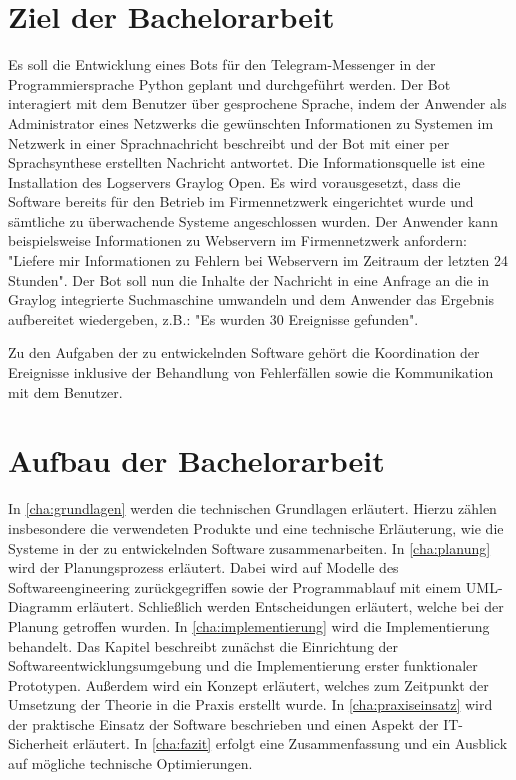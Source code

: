 \section{Ziel der Bachelorarbeit}

Es soll die Entwicklung eines Bots für den Telegram-Messenger in der Programmiersprache Python geplant und durchgeführt werden. Der Bot interagiert mit dem Benutzer über gesprochene Sprache, indem der Anwender als Administrator eines Netzwerks die gewünschten Informationen zu Systemen im Netzwerk in einer Sprachnachricht beschreibt und der Bot mit einer per Sprachsynthese erstellten Nachricht antwortet. Die Informationsquelle ist eine Installation des Logservers Graylog Open. Es wird vorausgesetzt, dass die Software bereits für den Betrieb im Firmennetzwerk eingerichtet wurde und sämtliche zu überwachende Systeme angeschlossen wurden. Der Anwender kann beispielsweise Informationen zu Webservern im Firmennetzwerk anfordern: "Liefere mir Informationen zu Fehlern bei Webservern im Zeitraum der letzten 24 Stunden". Der Bot soll nun die Inhalte der Nachricht in eine Anfrage an die in Graylog integrierte Suchmaschine umwandeln und dem Anwender das Ergebnis aufbereitet wiedergeben, z.B.: "Es wurden 30 Ereignisse gefunden". 

Zu den Aufgaben der zu entwickelnden Software gehört die Koordination der Ereignisse inklusive der Behandlung von Fehlerfällen sowie die Kommunikation mit dem Benutzer.

\section{Aufbau der Bachelorarbeit}

In \autoref{cha:grundlagen} werden die technischen Grundlagen erläutert. Hierzu zählen insbesondere die verwendeten Produkte und eine technische Erläuterung, wie die Systeme in der zu entwickelnden Software zusammenarbeiten. In \autoref{cha:planung} wird der Planungsprozess erläutert. Dabei wird auf Modelle des Softwareengineering zurückgegriffen sowie der Programmablauf mit einem UML-Diagramm erläutert. Schließlich werden Entscheidungen erläutert, welche bei der Planung getroffen wurden. In \autoref{cha:implementierung} wird die Implementierung behandelt. Das Kapitel beschreibt zunächst die Einrichtung der Softwareentwicklungsumgebung und die Implementierung erster funktionaler Prototypen. Außerdem wird ein Konzept erläutert, welches zum Zeitpunkt der Umsetzung der Theorie in die Praxis erstellt wurde. In \autoref{cha:praxiseinsatz} wird der praktische Einsatz der Software beschrieben und einen Aspekt der IT-Sicherheit erläutert. In \autoref{cha:fazit} erfolgt eine Zusammenfassung und ein Ausblick auf mögliche technische Optimierungen.